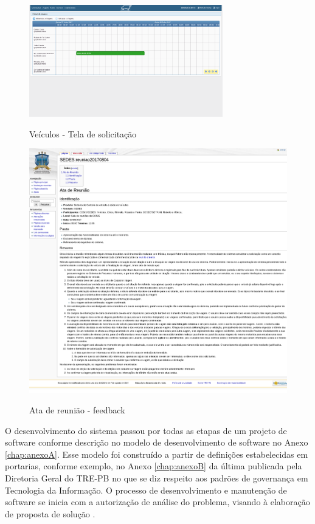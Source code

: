 \begin{figure}[!htb]
    \centering
    \caption{Veículos - Tela de solicitação}
    \includegraphics[width=0.75\textwidth]{./dados/figuras/veiculos-tela2.png}
    \label{fig:figura-motoristas}
\end{figure}

\begin{figure}[!htb]
    \centering
    \caption{Ata de reunião - feedback}
    \includegraphics[width=1\textwidth]{./dados/figuras/veiculos-ata1.png}
    \label{fig:figura-ata1}
\end{figure}

O desenvolvimento do sistema passou por todas as etapas de um projeto de software conforme descrição no modelo de desenvolvimento de software no Anexo \ref{chap:anexoA}. Esse modelo foi construído a partir de definições estabelecidas em portarias, conforme exemplo, no Anexo \ref{chap:anexoB} da última publicada pela Diretoria Geral do TRE-PB no que se diz respeito aos padrões de governança em Tecnologia da Informação.
O processo de desenvolvimento e manutenção de software se inicia com a autorização de análise do problema, visando à elaboração de proposta de solução  \cite[p.~2]{Portaria37:2017}.
 

